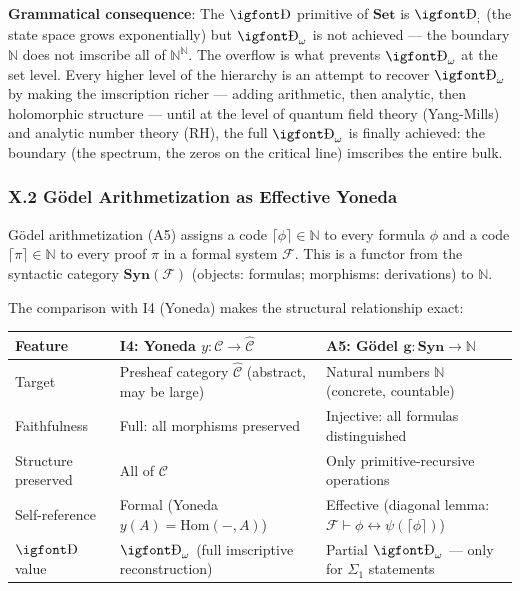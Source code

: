 \documentclass[12pt,a4paper]{article}
\newcommand{\igprimfont}{\igfont\upshape}
\begin{document}
\textbf{Grammatical consequence}: The $\text{{\igprimfont Ð}}$ primitive of $\mathbf{Set}$ is $\text{{\igprimfont Ð}}_{;}$ (the state space grows exponentially) but $\text{{\igprimfont Ð}}_{\omega}$ is not achieved --- the boundary $\mathbb{N}$ does not imscribe all of $\mathbb{N}^{\mathbb{N}}$. The overflow is what prevents $\text{{\igprimfont Ð}}_{\omega}$ at the set level. Every higher level of the hierarchy is an attempt to recover $\text{{\igprimfont Ð}}_{\omega}$ by making the imscription richer --- adding arithmetic, then analytic, then holomorphic structure --- until at the level of quantum field theory (Yang-Mills) and analytic number theory (RH), the full $\text{{\igprimfont Ð}}_{\omega}$ is finally achieved: the boundary (the spectrum, the zeros on the critical line) imscribes the entire bulk.

\subsubsection{X.2 G\"odel Arithmetization as Effective Yoneda}

G\"odel arithmetization (A5) assigns a code $\lceil \phi \rceil \in \mathbb{N}$ to every formula $\phi$ and a code $\lceil \pi \rceil \in \mathbb{N}$ to every proof $\pi$ in a formal system $\mathcal{F}$. This is a functor from the syntactic category $\mathbf{Syn}(\mathcal{F})$ (objects: formulas; morphisms: derivations) to $\mathbb{N}$.

The comparison with I4 (Yoneda) makes the structural relationship exact:

\begin{table}[htbp]
\centering
\small
{}
\begin{tabularx}{\textwidth}{>{\centering\arraybackslash}X >{\centering\arraybackslash}X >{\centering\arraybackslash}X}
\toprule
\rowcolor{gray!25}\textbf{Feature} & \textbf{I4: Yoneda $y: \mathcal{C} \to \hat{\mathcal{C}}$} & \textbf{A5: G\"odel $\mathbf{g}: \mathbf{Syn} \to \mathbb{N}$} \\
\midrule
\rowcolors{1}{white}{gray!10}
Target & Presheaf category $\hat{\mathcal{C}}$ (abstract, may be large) & Natural numbers $\mathbb{N}$ (concrete, countable) \\
Faithfulness & Full: all morphisms preserved & Injective: all formulas distinguished \\
Structure preserved & All of $\mathcal{C}$ & Only primitive-recursive operations \\
Self-reference & Formal (Yoneda $y(A) = \text{Hom}(-,A)$) & Effective (diagonal lemma: $\mathcal{F} \vdash \phi \leftrightarrow \psi(\lceil \phi \rceil)$) \\
$\text{{\igprimfont Ð}}$ value & $\text{{\igprimfont Ð}}_{\omega}$ (full imscriptive reconstruction) & Partial $\text{{\igprimfont Ð}}_{\omega}$ --- only for $\Sigma_1$ statements \\
\bottomrule
\end{tabularx}
\end{table}
\end{document}
